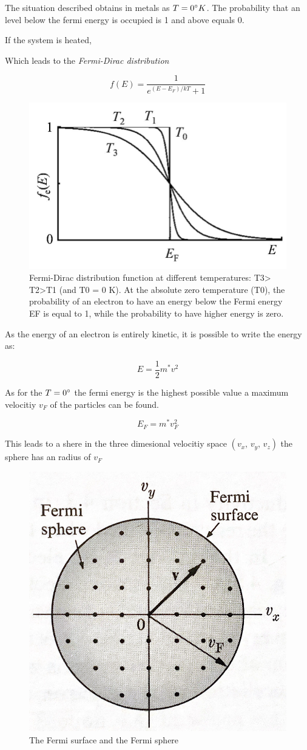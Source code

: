 The situation described obtains in metals as $T=0 \degree K$. The probability that 
an level below the fermi energy is occupied is 1 and above equals 0.

If the system is heated,

Which leads to the \textit{Fermi-Dirac distribution}

\begin{equation}
    f(E) = \frac{1}{e^{(E-E_F)/kT}+1}
\end{equation}

\begin{figure}[H]
    \centering
    \includegraphics[width=0.5\linewidth]{Graphics/Chapter1/Fermi-Dirac-distribution.png}
    \caption{Fermi-Dirac distribution function at different temperatures: T3> T2>T1
     (and T0 = 0 K). At the absolute zero temperature (T0), the probability of an 
     electron to have an energy below the Fermi energy EF is equal to 1, while the 
     probability to have higher energy is zero.}
    \label{}
\end{figure}

As the energy of an electron is entirely kinetic, it is possible
to write the energy as:

$$E = \frac{1}{2} m^* v^2$$

As for the $T=0 \degree$ the fermi energy is the highest possible value
a maximum velocitiy $v_F$ of the particles can be found. 

$$E_F = m^*v_F^2$$

This leads to a shere in the three dimesional velocitiy space
$(v_x, \, v_y, \, v_z)$ the sphere has an radius of $v_F$


\begin{figure}[H]
    \centering
    \includegraphics[width=0.4\linewidth]{Graphics/Chapter1/Fermi_Sphere.png}
    \caption{The Fermi surface and the Fermi sphere \cite[asdfadf]{elementary_SSP} }
    \label{}
\end{figure}

